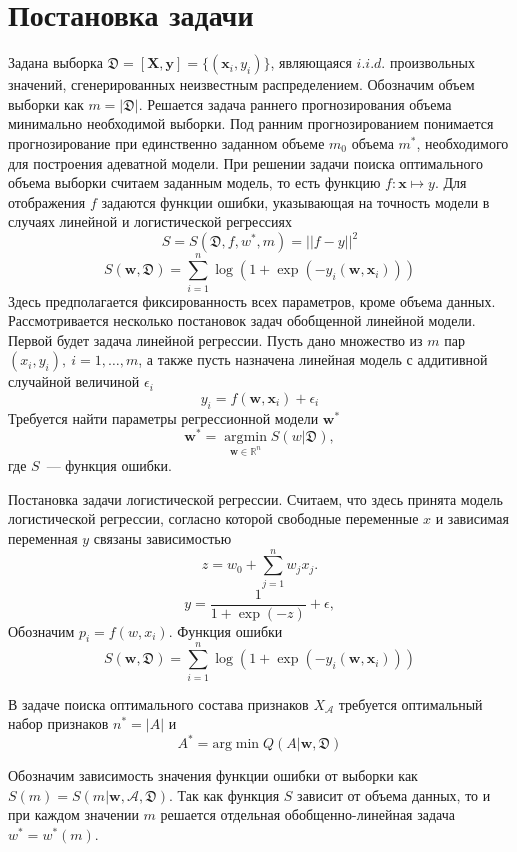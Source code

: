 \documentclass[12pt, twoside]{article}
\newcommand{\mb}[1]{\mathbf{#1}}
\begin{document}
\section{Постановка задачи}
Задана выборка $\mathfrak{D} = [\mathbf{X}, \mb{y}] = \{(\mb{x}_i, y_i)\}$, являющаяся $i.i.d.$ произвольных значений, сгенерированных неизвестным распределением. Обозначим объем выборки как $m = |\mathfrak{D}|$. Решается задача раннего прогнозирования объема минимально необходимой выборки. Под ранним прогнозированием понимается прогнозирование при единственно заданном объеме $m_0$ объема $m^*$, необходимого для построения адеватной модели. При решении задачи поиска оптимального объема выборки считаем заданным модель, то есть функцию $f: \mb{x} \mapsto y$. Для отображения $f$ задаются функции ошибки, указывающая на точность модели в случаях линейной и логистической регрессиях $$S = S(\mathfrak{D}, f, w^*, m) = ||f - y||^2$$ $$S(\textbf{w}, \mathfrak{D}) = \sum_{i=1}^n\log(1 + \exp(-y_i(\textbf{w},\textbf{x}_i)))$$ Здесь предполагается фиксированность всех параметров, кроме объема данных. Рассмотривается несколько постановок задач обобщенной линейной модели. Первой будет задача линейной регрессии. Пусть дано множество из $m$ пар $(x_i, y_i),\ i = 1,\ldots, m$, а также пусть назначена линейная модель с аддитивной случайной величиной $\epsilon_i$ $$y_i = f(\textbf{w}, \textbf{x}_i) + \epsilon_i$$ Требуется найти параметры регрессионной модели $\textbf{w}^*$ $$\textbf{w}^* = \underset{\textbf{w} \in \mathbb{R}^n}{\text{arg} \min}S(w| \mathfrak{D}), $$
где $S$~--- функция ошибки.

Постановка задачи логистической регрессии. Считаем, что здесь принята модель логистической регрессии, согласно которой свободные переменные $x$ и зависимая переменная $y$ связаны зависимостью $$z = w_0 + \sum_{j=1}^nw_jx_j.$$ $$y = \frac{1}{1 + \exp(-z)} + \epsilon,$$ Обозначим $p_i = f(w, x_i)$. Функция ошибки $$S(\textbf{w}, \mathfrak{D}) = \sum_{i=1}^n\log(1 + \exp(-y_i(\textbf{w},\textbf{x}_i)))$$

В задаче поиска оптимального состава признаков $X_{\mathcal{A}}$ требуется оптимальный набор признаков $n^* = |A|$ и $$A^* = \text{arg} \min Q(A| \textbf{w}, \mathfrak{D})$$

Обозначим зависимость значения функции ошибки от выборки как $S(m) = S(m| \textbf{w}, \mathcal{A}, \mathfrak{D})$. Так как функция $S$ зависит от объема данных, то и при каждом значении $m$ решается отдельная обобщенно-линейная задача $w^* = w^*(m)$.
\end{document}

